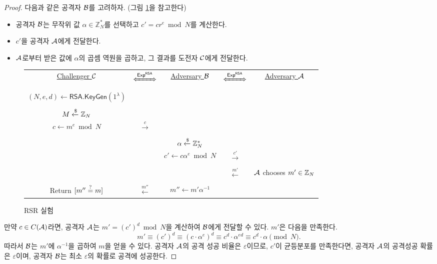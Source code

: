 \begin{proof}
    다음과 같은 공격자 $\mathcal{B}$를 고려하자. (그림 \ref{fig:rsr}을 참고한다)
    \begin{itemize}
        \item 공격자 $\mathcal{B}$는 무작위 값 $\alpha \in \mathbb{Z}_N^*$를 선택하고 $c' =
        cr^e \bmod N$를 계산한다. 
        \item $c'$을 공격자 $\mathcal{A}$에게 전달한다.
        \item $\mathcal{A}$로부터 받은 값에 $\alpha$의 곱셈 역원을 곱하고, 그 결과를 도전자
        $\mathcal{C}$에게 전달한다.
    \end{itemize}

    \begin{figure}[ht]
        \begin{tcolorbox}[colback=white]
        \centering
            \begin{tabularx}{\linewidth}{CcCcC}
                \underline{Challenger $\mathcal{C}$} & $\xLeftrightarrow{\EXP^{\RSA}}$ & \underline{Adversary $\mathcal{B}$} & $\xLeftrightarrow{\EXP^{\RSA}}$ & \underline{Adversary $\mathcal{A}$} \\
                \\
                $(N, e, d) \gets \textsf{RSA.KeyGen}(1^{\lambda})$ & & & & \\
                \\
                $M \xleftarrow{\$} \mathbb{Z}_N$ & & & & \\
                $c \gets m^e \bmod N$ & $\xrightarrow{c}$ & & & \\
                \\
                & & $\alpha \xleftarrow{\$} \mathbb{Z}^*_N$ & & \\
                & & $c' \gets c \alpha^e \bmod N$ & $\xrightarrow{c'}$ & \\
                \\
                & & & $\xleftarrow{m'}$ & $\mathcal{A}$ chooses $m' \in \mathbb{Z}_N$ \\
                \\
                Return $[m'' \overset{?}{=} m]$ & $\xleftarrow{m''}$ & $m'' \gets m' \alpha^{-1}$ & & \\
            \end{tabularx}  
        \end{tcolorbox}
        \caption{RSR 실험}
        \label{fig:rsr}
    \end{figure}

    만약 $c \in C(\mathcal{A})$라면, 공격자 $\mathcal{A}$는 $m' = (c')^d \bmod N$을 계산하여
    $\mathcal{B}$에게 전달할 수 있다. $m'$은 다음을 만족한다.
    $$
        m' \equiv (c')^d 
        \equiv (c \cdot \alpha^e)^d 
        \equiv c^d \cdot \alpha^{ed} 
        \equiv c^d \cdot \alpha \pmod N.
    $$
    따라서 $\mathcal{B}$는 $m'$에 $\alpha^{-1}$을 곱하여 $m$을 얻을 수 있다. 공격자
    $\mathcal{A}$의 공격 성공 비율은 $\varepsilon$이므로, $c'$이 균등분포를 만족한다면,
    공격자 $\mathcal{A}$의 공격성공 확률은 $\varepsilon$이며, 공격자 $\mathcal{B}$는 최소
    $\varepsilon$의 확률로 공격에 성공한다. 


\end{proof}
